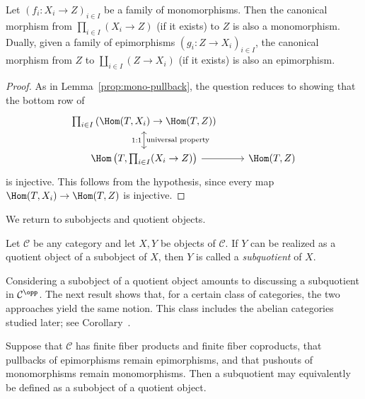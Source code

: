 \begin{lemma}\label{prop:mono-product}
	Let $(f_i:X_i\to Z)_{i\in I}$ be a family of monomorphisms. Then the
	canonical morphism from $\prod_{i\in I}(X_i\to Z)$ (if it exists) to $Z$
	is also a monomorphism. Dually, given a family of epimorphisms
	$(g_i:Z\to X_i)_{i\in I}$, the canonical morphism from $Z$ to
	$\coprod_{i\in I}(Z\to X_i)$ (if it exists) is also an epimorphism.
\end{lemma}

\begin{proof}
	As in Lemma~\ref{prop:mono-pullback}, the question reduces to showing that
	the bottom row of
	\[\begin{tikzcd}
		\prod_{i \in I} \left( \Hom(T, X_i) \to \Hom(T, Z) \right) & \\
		\Hom\left(T, \prod_{i \in I} (X_i \to Z) \right) \arrow[leftrightarrow, u, "1:1", "\text{universal property}"'] \arrow[r] & \Hom(T, Z)
	\end{tikzcd}\]
	is injective. This follows from the hypothesis, since every map
	$\Hom(T,X_i)\to\Hom(T,Z)$ is injective.
\end{proof}

We return to subobjects and quotient objects.

\begin{definition}\label{def:subquotient}
	Let $\mathcal C$ be any category and let $X,Y$ be objects of $\mathcal C$.
	If $Y$ can be realized as a quotient object of a subobject of $X$, then
	$Y$ is called a \emph{subquotient} of $X$.
\end{definition}

Considering a subobject of a quotient object amounts to discussing a
subquotient in $\mathcal C^{\opp}$. The next result shows that, for a certain
class of categories, the two approaches yield the same notion. This class
includes the abelian categories studied later; see
Corollary~.

\begin{proposition}\label{prop:subquotient-equiv}
	Suppose that $\mathcal C$ has finite fiber products and finite fiber
	coproducts, that pullbacks of epimorphisms remain epimorphisms, and that
	pushouts of monomorphisms remain monomorphisms. Then a subquotient may
	equivalently be defined as a subobject of a quotient object.
\end{proposition}

